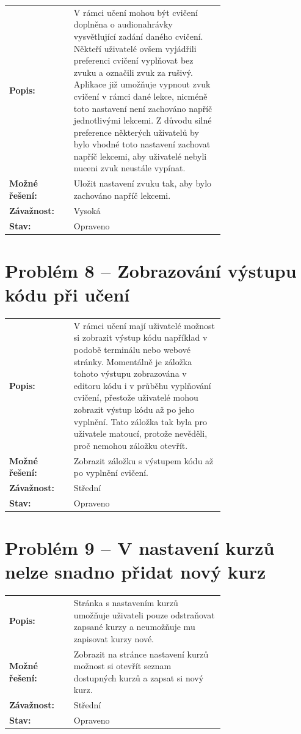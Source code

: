 \begin{tabular}{lp{0.7\linewidth}}
    \textbf{Popis:} & V rámci učení mohou být cvičení doplněna o audionahrávky vysvětlující zadání daného cvičení. Někteří uživatelé ovšem vyjádřili preferenci cvičení vyplňovat bez zvuku a označili zvuk za rušivý. Aplikace již umožňuje vypnout zvuk cvičení v rámci dané lekce, nicméně toto nastavení není zachováno napříč jednotlivými lekcemi. Z důvodu silné preference některých uživatelů by bylo vhodné toto nastavení zachovat napříč lekcemi, aby uživatelé nebyli nuceni zvuk neustále vypínat. \\
    \textbf{Možné řešení:} & Uložit nastavení zvuku tak, aby bylo zachováno napříč lekcemi. \\
    \textbf{Závažnost:} & Vysoká \\
    \textbf{Stav:} & Opraveno  \\
\end{tabular}

\section*{Problém 8 – Zobrazování výstupu kódu při učení}

\begin{tabular}{lp{0.7\linewidth}}
    \textbf{Popis:} & V rámci učení mají uživatelé možnost si zobrazit výstup kódu například v podobě terminálu nebo webové stránky. Momentálně je záložka tohoto výstupu zobrazována v editoru kódu i v průběhu vyplňování cvičení, přestože uživatelé mohou zobrazit výstup kódu až po jeho vyplnění. Tato záložka tak byla pro uživatele matoucí, protože nevěděli, proč nemohou záložku otevřít.  \\
    \textbf{Možné řešení:} & Zobrazit záložku s výstupem kódu až po vyplnění cvičení. \\ 
    \textbf{Závažnost:} & Střední \\
    \textbf{Stav:} & Opraveno  \\
\end{tabular}

\section*{Problém 9 – V nastavení kurzů nelze snadno přidat nový kurz}

\begin{tabular}{lp{0.7\linewidth}}
    \textbf{Popis:} & Stránka s nastavením kurzů umožňuje uživateli pouze odstraňovat zapsané kurzy a neumožňuje mu zapisovat kurzy nové.  \\
    \textbf{Možné řešení:} & Zobrazit na stránce nastavení kurzů možnost si otevřít seznam dostupných kurzů a zapsat si nový kurz. \\ 
    \textbf{Závažnost:} & Střední \\
    \textbf{Stav:} & Opraveno  \\
\end{tabular}

